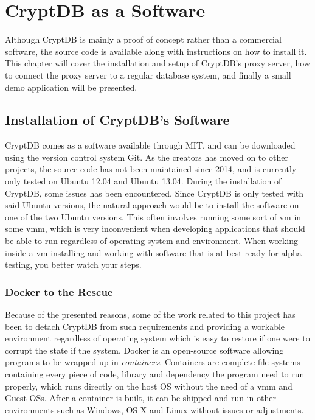 \chapter{CryptDB as a Software}
\label{chp:software}

Although CryptDB is mainly a proof of concept rather than a commercial software, the source code is available along with instructions on how to install it. This chapter will cover the installation and setup of CryptDB's proxy server, how to connect the proxy server to a regular database system, and finally a small demo application will be presented.

\section{Installation of CryptDB's Software}

CryptDB comes as a software available through MIT, and can be downloaded using the version control system Git. As the creators has moved on to other projects, the source code has not been maintained since 2014, and is currently only tested on Ubuntu 12.04 and Ubuntu 13.04. During the installation of CryptDB, some issues has been encountered. Since CryptDB is only tested with said Ubuntu versions, the natural approach would be to install the software on one of the two Ubuntu versions. This often involves running some sort of \gls{vm} in some \gls{vmm}, which is very inconvenient when developing applications that should be able to run regardless of operating system and environment. When working inside a \gls{vm} installing and working with software that is at best ready for alpha testing, you better watch your steps. 

\subsection{Docker to the Rescue}


Because of the presented reasons, some of the work related to this project has been to detach CryptDB from such requirements and providing a workable environment regardless of operating system which is easy to restore if one were to corrupt the state if the system. Docker \cite{docker_homepage} is an open-source software allowing programs to be wrapped up in \emph{containers}. Containers are complete file systems containing every piece of code, 
library and dependency the program need to run properly, which runs directly on the host OS without the need of a \gls{vmm} and Guest OSs. After a container is built, it can be shipped and run in other environments such as Windows, OS X and Linux without issues or adjustments.

